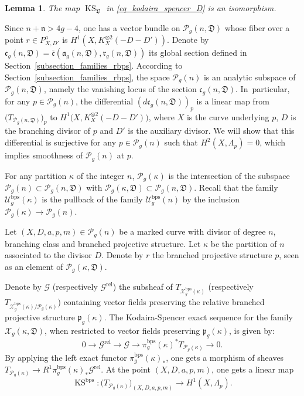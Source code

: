 \documentclass[JEP,XML,SOM,Unicode,NoEqCountersInSection,published]{cedram}
\newcommand{\BPS}{\mathrm{bps}}
\newcommand{\rel}{\mathrm{rel}}
\DeclareMathOperator{\KS}{KS}
\theoremstyle{definition}
\theoremstyle{plain}
\newtheorem{lemma}[definition]{Lemma}
\begin{document}
\begin{lemma}
The map $\KS_{\mathfrak D}$ in \eqref{eq_kodaira_spencer_D} is an isomorphism.
\end{lemma}

Since $n + \mathfrak n > 4g-4$, one has a vector bundle on $\mathcal P_g(n, \mathfrak D)$ whose fiber over a point $r \in P_{X, D'}^a$ is $H^1\left(X, K_X^{\otimes 2}(-D-D')\right)$.
Denote by $\mathfrak c_g(n, \mathfrak D) = \overline {\mathfrak c}(\mathfrak a_g(n, \mathfrak D), \mathfrak r_g(n, \mathfrak D))$ its global section defined in Section~\ref{subsection_families_rbps}.
According to Section~\ref{subsection_families_rbps}, the space $\mathcal P_g(n)$ is an analytic subspace of $\mathcal P_g(n, \mathfrak D)$, namely the vanishing locus of the section $\mathfrak c_g(n, \mathfrak D)$. In~particular, for any $p \in \mathcal P_g(n)$, the differential $(d \mathfrak c_g(n, \mathfrak D))_p$ is a linear map from $\bigl(T_{\mathcal P_g(n, \mathfrak D)}\bigr)_p$ to $H^1\bigl(X, K_X^{\otimes 2}(-D-D')\bigr)$, where $X$ is the curve underlying $p$, $D$ is the branching divisor of $p$ and $D'$ is the auxiliary divisor.
We will show that this differential is surjective for any $p \in \mathcal P_g(n)$ such that $H^2(X, \Lambda_p)=0$, which implies smoothness of $\mathcal P_g(n)$ at $p$.

For any partition $\kappa$ of the integer $n$, $\mathcal P_g(\kappa)$ is the intersection of the subspace $\mathcal P_g(n) \subset \mathcal P_g(n, \mathfrak D)$ with $\mathcal P_g(\kappa, \mathfrak D) \subset \mathcal P_g(n, \mathfrak D)$.
Recall that the family $\mathcal U_g^{\BPS}(\kappa)$ is the pullback of the family $\mathcal U_g^{\BPS}(n)$ by the inclusion $\mathcal P_g(\kappa) \to \mathcal P_g(n)$.

Let $(X, D, a, p, m) \in \mathcal P_g(n)$ be a marked curve with divisor of degree $n$, branching class and branched projective structure.
Let $\kappa$ be the partition of $n$ associated to the divisor $D$.
Denote by $r$ the branched projective structure $p$, seen as an element of $\mathcal P_g(\kappa, \mathfrak D)$.

Denote by $\mathcal G$ (respectively $\mathcal G^{\rel}$) the subsheaf of $T_{\mathcal X_g^{\BPS}(\kappa)}$ (respectively $T_{\mathcal X_g^{\BPS}(\kappa)/\mathcal P_g(\kappa)}$) containing vector fields preserving the relative branched projective structure $\mathfrak p_g(\kappa)$.
The Kodaira-Spencer exact sequence for the family $\mathcal X_g(\kappa, \mathfrak D)$, when restricted to vector fields preserving $\mathfrak p_g(\kappa)$, is given by:
\begin{equation*}
0 \to \mathcal G^{\rel} \to \mathcal G \to \pi_g^{\BPS}(\kappa)^* T_{\mathcal P_g(\kappa)} \to 0.
\end{equation*}
By applying the left exact functor $\pi_g^{\BPS}(\kappa)_*$, one gets a morphism of sheaves $T_{\mathcal P_g(\kappa)} \to R^1 \pi_g^{\BPS}(\kappa)_* \mathcal G^{\rel}$.
At the point $(X, D, a, p, m)$, one gets a linear map
\begin{equation}\label{eq_kodaira_spencer_3bis}
\KS^{\BPS}: \bigl(T_{\mathcal P_g(\kappa)}\bigr)_{(X, D, a, p, m)} \to H^1(X, \Lambda_p).
\end{equation}
\end{document}
